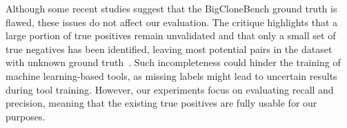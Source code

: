 Although some recent studies suggest that the BigCloneBench ground truth is flawed, these issues do not affect our evaluation. The critique highlights that a large portion of true positives remain unvalidated and that only a small set of true negatives has been identified, leaving most potential pairs in the dataset with unknown ground truth~\cite{krinke2022bigclonebench}. Such incompleteness could hinder the training of machine learning-based tools, as missing labels might lead to uncertain results during tool training. However, our experiments focus on evaluating recall and precision, meaning that the existing true positives are fully usable for our purposes.


